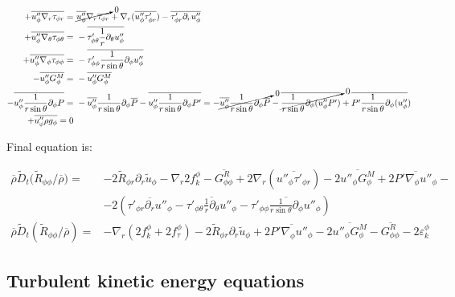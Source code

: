 \documentclass[10pt,paper=a4]{report}
\newcommand{\eht}{\overline}
\newcommand{\fht}{\widetilde}
\begin{document}
\begin{align}
+\eht{u''_\phi \nabla_r \tau_{\phi r}} = & \ \cancelto{0}{\eht{u''_\phi}\nabla_r \eht{\tau_{\phi r}}} + \nabla_r (\eht{u''_\phi \tau'_{\phi r}}) - \eht{\tau'_{\phi r}\partial_r u''_\phi}\\
+\eht{u''_\phi \nabla_\theta \tau_{\phi \theta}} = & \ -\eht{\tau'_{\phi \theta} \frac{1}{r}\partial_\theta u''_\phi} \\
+\eht{u''_\phi \nabla_\phi \tau_{\phi \phi}} = & \ -\eht{\tau'_{\phi \phi} \frac{1}{r\sin{\theta}} \partial_\phi u''_\phi} \\
-\eht{u''_\phi G_\phi^M} = & \ -\eht{u''_\phi G_\phi^M} \\
-\eht{u''_\phi \frac{1}{r\sin{\theta}}\partial_\phi P } = & \ -\eht{u''_\phi}\frac{1}{r\sin{\theta}}\partial_\phi \eht{P} - \eht{u''_\phi \frac{1}{r\sin{\theta}}\partial_\phi P'} = -\cancelto{0}{\eht{u''_\phi}\frac{1}{r\sin{\theta}}\partial_\phi \eht{P}} - \cancelto{0}{\eht{\frac{1}{r\sin{\theta}}\partial_\phi (u''_\phi P')}} + \eht{P'\frac{1}{r\sin{\theta}}\partial_\phi (u''_\phi}) \\
+\eht{u''_\phi \rho g_\phi} = 0 & \ 
\end{align}

\noindent
Final equation is:

\begin{align}
\eht{\rho}\fht{D}_t \big( \fht{R}_{\phi \phi} / \eht{\rho} \big) = & -2\fht{R}_{\phi r}\partial_r \fht{u}_\phi -\nabla_r 2 f_k^\phi - \eht{G_{\phi \phi}^R} + 2\nabla_r (\eht{u''_\phi \tau'_{\phi r}}) - 2\eht{u''_\phi G_\phi^M} + 2\eht{P'\nabla_\phi u''_\phi} - \nonumber \\ 
& - 2 \left(\eht{\tau'_{\phi r}\partial_r u''_\phi} - \eht{\tau'_{\phi \theta} \frac{1}{r}\partial_\theta u''_\phi} - \eht{\tau'_{\phi \phi} \frac{1}{r\sin{\theta}} \partial_\phi u''_\phi} \right) \\
\eht{\rho}\fht{D}_t \left( \fht{R}_{\phi \phi} / \eht{\rho} \right) = & -\nabla_r ( 2 f_k^\phi + 2 f_\tau^\phi) - 2\fht{R}_{\phi r}\partial_r \fht{u}_\phi +2\eht{P' \nabla_\phi u''_\phi}  - 2\overline{u''_\phi G^{M}_\phi} - \eht{G^{R}_{\phi \phi}} - 2\varepsilon_k^\phi 
\end{align}

\newpage

\subsection{Turbulent kinetic energy equations}
\end{document}

